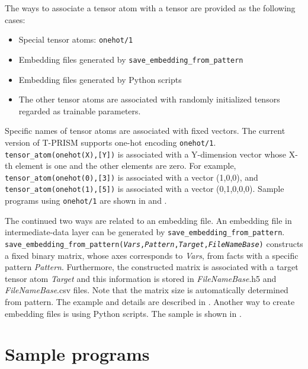 \documentclass[a4paper]{report}
\begin{document}
The ways to associate a tensor atom with a tensor are provided as the following cases:
\begin{itemize}
 \item Special tensor atoms: {\tt onehot/1}
 \item Embedding files generated by {\tt save\_embedding\_from\_pattern}
 \item Embedding files generated by Python scripts 
 \item The other tensor atoms are associated with randomly initialized tensors regarded as trainable parameters.
\end{itemize}

Specific names of tensor atoms are associated with fixed vectors.
The current version of T-PRISM supports one-hot encoding {\tt onehot/1}.
{\tt tensor\_atom(onehot(X),[Y])} is associated with a Y-dimension vector whose X-th element is one and the other elements are zero.
For example,
{\tt tensor\_atom(onehot(0),[3])} is associated with a vector (1,0,0),
and {\tt tensor\_atom(onehot(1),[5])} is associated with a vector (0,1,0,0,0).
Sample programs using {\tt onehot/1} are shown in  and .

The continued two ways are related to an embedding file.
An embedding file in intermediate-data layer can be generated by {\tt save\_embedding\_from\_pattern}.
{\tt save\_embedding\_from\_pattern({\it Vars},{\it Pattern},{\it Target},{\it FileNameBase})}
constructs a fixed binary matrix, whose axes corresponds to {\it Vars}, from facts with a specific pattern {\it Pattern}. Furthermore, the constructed matrix is associated with a target tensor atom {\it Target} and this information is stored in {\it FileNameBase}.h5 and {\it FileNameBase}.csv files.
Note that the matrix size is automatically determined from pattern.
The example and details are described in .
Another way to create embedding files is using Python scripts.
The sample is shown in .



\chapter{Sample programs}
\label{chap:tprism_sample}
\end{document}
